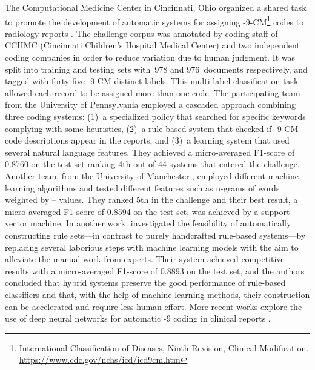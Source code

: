 The Computational Medicine Center in Cincinnati, Ohio organized a shared task to promote the development of automatic systems for assigning -9-CM\footnote{International Classification of Diseases, Ninth Revision, Clinical Modification. \url{https://www.cdc.gov/nchs/icd/icd9cm.htm}} codes to radiology reports \parencite{pestian2007a}.
The challenge corpus was annotated by coding staff of CCHMC (Cincinnati Children's Hospital Medical Center) and two independent coding companies in order to reduce variation due to human judgment.
It was split into training and testing sets with~978 and 976~documents respectively, and tagged with forty-five -9-CM distinct labels.
This multi-label classification task allowed each record to be assigned more than one code.
The participating team from the University of Pennsylvania \parencite{crammer2007a} employed a cascaded approach combining three coding systems: (1)~a specialized policy that searched for specific keywords complying with some heuristics, (2)~a rule-based system that checked if -9-CM code descriptions appear in the reports, and (3)~a learning system that used several natural language features.
They achieved a micro-averaged F1-score of 0.8760 on the test set ranking 4th out of 44 systems that entered the challenge.
Another team, from the University of Manchester \parencite{sasaki2007a}, employed different machine learning algorithms and tested different features such as n-grams of words weighted by -- values.
They ranked 5th in the challenge and their best result, a micro-averaged F1-score of 0.8594 on the test set, was achieved by a support vector machine.
In another work, \textcite{farkas2008a} investigated the feasibility of automatically constructing rule sets---in contrast to purely handcrafted rule-based systems---by replacing several laborious steps with machine learning models with the aim to alleviate the manual work from experts.
Their system achieved competitive results with a micro-averaged F1-score of 0.8893 on the test set, and the authors concluded that hybrid systems preserve the good performance of rule-based classifiers and that, with the help of machine learning methods, their construction can be accelerated and require less human effort.
More recent works explore the use of deep neural networks for automatic -9 coding in clinical reports \parencite{pereira2018c,zeng2019b}.

